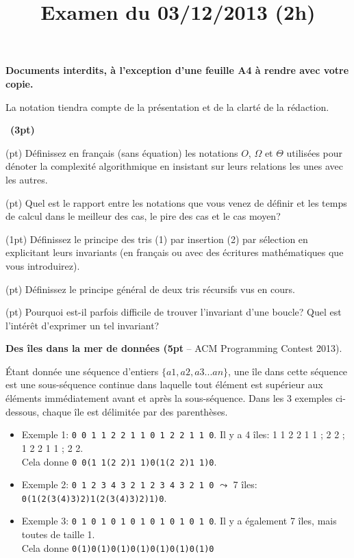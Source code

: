 \documentclass[10pt]{article}\usepackage[nu]{esial}
\begin{document}
\title{Examen du 03/12/2013 (2h)}
\maketitle

\begin{centering}
  \textbf{\large Documents interdits, à l'exception d'une feuille A4 à rendre
    avec votre copie.}

\end{centering}
\centerline{La notation tiendra compte de la présentation et de la clarté de
  la rédaction.}
\bigskip

\QuestionCours~\textbf{(3pt)}

\Question(\textonehalf pt) Définissez en français (sans équation) les notations
$O$, $\Omega$ et $\Theta$ utilisées pour dénoter la complexité algorithmique en
insistant sur leurs relations les unes avec les autres.

\Question(\textonehalf pt) Quel est le rapport entre les notations que vous venez de définir et
les temps de calcul dans le meilleur des cas, le pire des cas et le cas moyen? 

\Question(1pt) Définissez le principe des tris (1) par insertion (2) par
sélection en explicitant leurs invariants (en français ou avec des écritures
mathématiques que vous introduirez).

\Question(\textonehalf pt) Définissez le principe général de deux tris récursifs
vus en cours.

\Question(\textonehalf pt) Pourquoi est-il parfois difficile de trouver
l'invariant d'une boucle? Quel est l'intérêt d'exprimer un tel invariant?

\Exercice\textbf{Des îles dans la mer de données {\rm(}5pt} -- ACM Programming Contest 2013).

Étant donnée une séquence d'entiers $\{a1, a2, a3 ... an\}$, une île dans cette
séquence est une sous-séquence continue dans laquelle tout élément est supérieur
aux éléments immédiatement avant et après la sous-séquence.  Dans les 3 exemples
ci-dessous, chaque île est délimitée par des parenthèses.

\begin{itemize}
\item Exemple 1:  \texttt{0 0 1 1 2 2 1 1 0 1 2 2 1 1 0}.
  Il y a 4 îles: 1 1 2 2 1 1 ; 2 2  ; 1 2 2 1 1 ; 2 2. \\
  Cela donne \hspace{3pt}\texttt{0 0(1 1(2 2)1 1)0(1(2 2)1 1)0}.
\item Exemple 2: \texttt{0 1 2 3 4 3 2 1 2 3 4 3 2 1 0} $\leadsto$ 7 îles:
  \texttt{0(1(2(3(4)3)2)1(2(3(4)3)2)1)0}.
\item Exemple 3: \texttt{0 1 0 1 0 1 0 1 0 1 0 1 0 1 0}. Il y a également 7
  îles, mais toutes de taille 1.\\
  Cela donne \hspace{3pt}\texttt{0(1)0(1)0(1)0(1)0(1)0(1)0(1)0}
\end{itemize}
\end{document}
